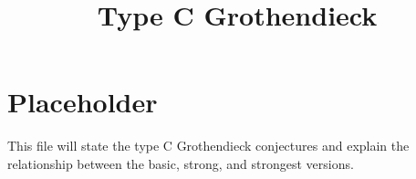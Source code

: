 \documentclass{article}
\title{Type C Grothendieck}
\author{}
\date{}
\begin{document}
\maketitle

\section{Placeholder}

This file will state the type C Grothendieck conjectures and explain the
relationship between the basic, strong, and strongest versions.
\end{document}
